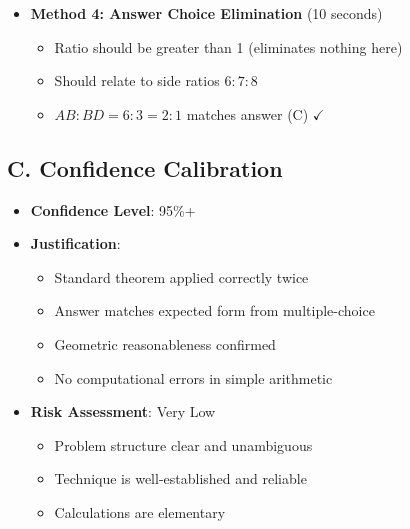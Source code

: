 \documentclass[12pt]{article}
\begin{document}
\begin{verificationbox}
\begin{itemize}[leftmargin=*]
    \item \textbf{Method 4: Answer Choice Elimination} (10 seconds)
    \begin{itemize}
        \item Ratio should be greater than 1 (eliminates nothing here)
        \item Should relate to side ratios $6:7:8$
        \item $AB:BD = 6:3 = 2:1$ matches answer (C) $\checkmark$
    \end{itemize}
\end{itemize}

\subsection*{C. Confidence Calibration}
\begin{itemize}[leftmargin=*]
    \item \textbf{Confidence Level}: 95\%+
    
    \item \textbf{Justification}:
    \begin{itemize}
        \item Standard theorem applied correctly twice
        \item Answer matches expected form from multiple-choice
        \item Geometric reasonableness confirmed
        \item No computational errors in simple arithmetic
    \end{itemize}
    
    \item \textbf{Risk Assessment}: Very Low
    \begin{itemize}
        \item Problem structure clear and unambiguous
        \item Technique is well-established and reliable
        \item Calculations are elementary
    \end{itemize}
\end{itemize}
\end{verificationbox}
\end{document}
